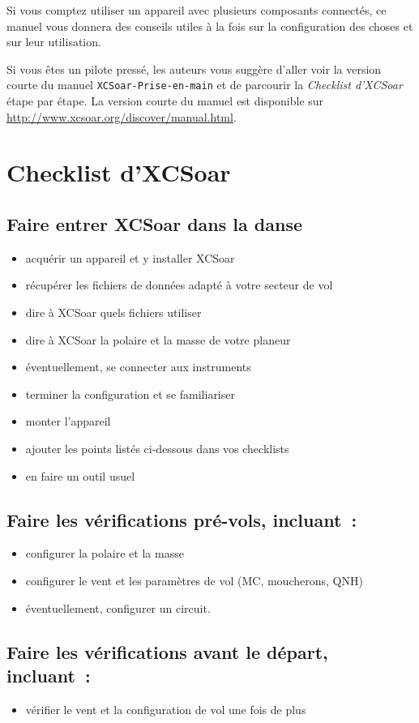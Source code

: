 Si vous comptez utiliser un appareil avec plusieurs composants connectés,
ce manuel vous donnera des conseils utiles à la fois sur la configuration des choses et sur
leur utilisation.

Si vous êtes un pilote pressé, les auteurs vous suggère d'aller voir la version courte
du manuel \texttt{XCSoar-Prise-en-main} et de parcourir la \emph{Checklist d'XCSoar}
étape par étape. La version courte du manuel est disponible sur \url{http://www.xcsoar.org/discover/manual.html}.

\section{Checklist d'XCSoar}

\subsection*{{Faire entrer XCSoar dans la danse}}
\begin{itemize}
\item acquérir un appareil et y installer XCSoar
\item récupérer les fichiers de données adapté à votre secteur de vol
\item dire à XCSoar quels fichiers utiliser
\item dire à XCSoar la polaire et la masse de votre planeur
\item éventuellement, se connecter aux instruments
\item terminer la configuration et se familiariser
\item monter l'appareil
\item ajouter les points listés ci-dessous dans vos checklists
\item en faire un outil usuel
\end{itemize}

\subsection*{Faire les vérifications pré-vols, incluant~:}
\begin{itemize}
\item configurer la polaire et la masse
\item configurer le vent et les paramètres de vol (MC, moucherons, QNH)
\item éventuellement, configurer un circuit.
\end{itemize}

\subsection*{Faire les vérifications avant le départ, incluant~:}
\begin{itemize}
\item vérifier le vent et la configuration de vol une fois de plus
\end{itemize}
\vspace{2em}

